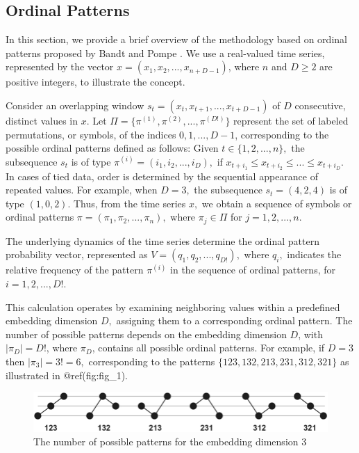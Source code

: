 \documentclass[sn-basic,pdflatex]{sn-jnl}
\theoremstyle{remark}
\theoremstyle{definition}
\begin{document}
\subsection{Ordinal Patterns}\label{ordinal-patterns}

In this section, we provide a brief overview of the methodology based on
ordinal patterns proposed by Bandt and Pompe
\citep{PhysRevLett.88.174102}. We use a real-valued time series,
represented by the vector \(x = (x_1, x_2, ..., x_{n+D-1})\), where
\(n\) and \(D\ge 2\) are positive integers, to illustrate the concept.

Consider an overlapping window \(s_t=(x_t, x_{t+1}, ..., x_{t+D-1})\) of
\(D\) consecutive, distinct values in \(x\). Let
\(\Pi=\{\pi^{(1)}, \pi^{(2)}, ..., \pi^{(D!)}\}\) represent the set of
labeled permutations, or symbols, of the indices \(0,1,...,D-1\),
corresponding to the possible ordinal patterns defined as follows: Given
\(t \in \{1,2,...,n\},\) the subsequence \(s_t\) is of type
\(\pi^{(i)}=(i_1, i_2, ..., i_D),\) if
\(x_{t+i_1}\le x_{t+i_2} \le ...\le x_{t+i_D}.\) In cases of tied data,
order is determined by the sequential appearance of repeated values. For
example, when \(D=3,\) the subsequence \(s_t=(4,2,4)\) is of type
\((1,0,2)\). Thus, from the time series \(x,\) we obtain a sequence of
symbols or ordinal patterns \(\pi=(\pi_1, \pi_2, ..., \pi_n),\) where
\(\pi_j \in \Pi\) for \(j=1,2,...,n.\)

The underlying dynamics of the time series determine the ordinal pattern
probability vector, represented as \(V = (q_1,q_2, ..., q_{D!}),\) where
\(q_i,\) indicates the relative frequency of the pattern \(\pi^{(i)}\)
in the sequence of ordinal patterns, for \(i=1,2,...,D!.\)

This calculation operates by examining neighboring values within a
predefined embedding dimension \(D,\) assigning them to a corresponding
ordinal pattern. The number of possible patterns depends on the
embedding dimension \(D\), with \(|\pi_D|=D!\), where \(\pi_D\),
contains all possible ordinal patterns. For example, if \(D=3\) then
\(|\pi_3|=3!=6,\) corresponding to the patterns
\(\{123, 132, 213, 231, 312, 321\}\) as illustrated in @ref(fig:fig\_1).

\begin{figure}
\includegraphics{./fig_1} \caption{The number of possible patterns for the embedding dimension 3}\label{fig:fig_1}
\end{figure}
\end{document}
